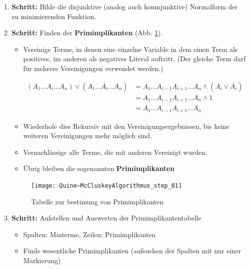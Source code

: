 \documentclass[12pt]{report}
\begin{document}
\begin{enumerate}
  \item \textbf{Schritt:} Bilde die disjunktive (analog auch konmjunktive) Normalform der zu minimierenden Funktion.
  \item \textbf{Schritt:} Finden der \textbf{Primimplikanten} (Abb. \ref{fig:Quine–McCluskeyAlgorithmus_step_01}).
        \begin{itemize}
          \item Vereinige Terme, in denen eine einzelne Variable
                in dem einen Term als positives, im anderen als negatives Literal auftritt.
                (Der gleiche Term darf für mehrere Vereinigungen verwendet werden.)

                \begin{align*}
                  (A_1 ... A_i ... A_n) \vee (A_1 ... \overline{A_i} ... A_n)
                   & = A_1 ... A_{i-1} A_{i+1} ... A_n \wedge (A_i \vee \overline{A_i})  \\
                   & = A_1 ... A_{i-1} A_{i+1} ... A_n \wedge 1                          \\
                   & = A_1 ... A_{i-1} A_{i+1} ... A_n                                  
                \end{align*}
          \item Wiederhole dies Rekursiv mit den Vereinigungsergebnissen, bis keine weiteren Vereinigungen mehr möglich sind.
          \item Vernachlässige alle Terme, die mit anderen Vereinigt wurden.
          \item Übrig bleiben die sogenannten \textbf{Primimplikanten}
        \end{itemize}

        \begin{figure}[H]
          \caption{Tabelle zur bestimung von Primimplikanten}
          \label{fig:Quine–McCluskeyAlgorithmus_step_01}
          \centering
          \texttt{[image: Quine–McCluskeyAlgorithmus\_step\_01]}
        \end{figure}

  \item \textbf{Schritt:} Aufstellen und Auswerten der Primimplikantentabelle
        \begin{itemize}
          \item Spalten: Minterme, Zeilen: Primimplikanten
          \item Finde wesentliche Primimplikanten (aufsuchen der Spalten mit nur einer Markierung)


\end{itemize}
\end{enumerate}
\end{document}
